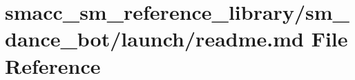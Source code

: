 \hypertarget{smacc__sm__reference__library_2sm__dance__bot_2launch_2readme_8md}{}\section{smacc\+\_\+sm\+\_\+reference\+\_\+library/sm\+\_\+dance\+\_\+bot/launch/readme.md File Reference}
\label{smacc__sm__reference__library_2sm__dance__bot_2launch_2readme_8md}
